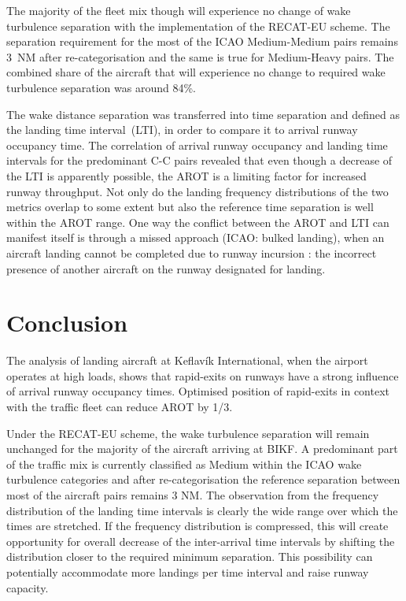 The majority of the fleet mix though will experience no change of wake turbulence separation with the implementation of the RECAT-EU scheme. The separation requirement for the most of the ICAO Medium-Medium pairs remains 3~NM after re-categorisation and the same is true for Medium-Heavy pairs. The combined share of the aircraft that will experience no change to required wake turbulence separation was around 84\%. 

The wake distance separation was transferred into time separation and defined as the landing time interval~(LTI), in order to compare it to arrival runway occupancy time.
The correlation of arrival runway occupancy and landing time intervals for the predominant C-C pairs revealed that even though a decrease of the LTI is apparently possible, the AROT is a limiting factor for increased runway throughput. Not only do the landing frequency distributions of the two metrics overlap to some extent but also the reference time separation is well within the AROT range. One way the conflict between the AROT and LTI can manifest itself is through a missed approach (ICAO: bulked landing), when an aircraft landing cannot be completed due to runway incursion \cite{doc44444}: the incorrect presence of another aircraft on the runway designated for landing.

\chapter{Conclusion\label{cha:conclusions}}
The analysis of landing aircraft at Keflavík International, when the airport operates at high loads, shows that rapid-exits on runways have a strong influence of arrival runway occupancy times. Optimised position of rapid-exits in context with the traffic fleet can reduce AROT by 1/3.%

Under the RECAT-EU scheme, the wake turbulence separation will remain unchanged for the majority of the aircraft arriving at BIKF. A predominant part of the traffic mix is currently classified as Medium within the ICAO wake turbulence categories and after re-categorisation the reference separation between most of the aircraft pairs remains 3 NM. The observation from the frequency distribution of the landing time intervals is clearly the wide range over which the times are stretched. If the frequency distribution is compressed, this will create opportunity for overall decrease of the inter-arrival time intervals by shifting the distribution closer to the required minimum separation. This possibility can potentially accommodate more landings per time interval and raise runway capacity.

